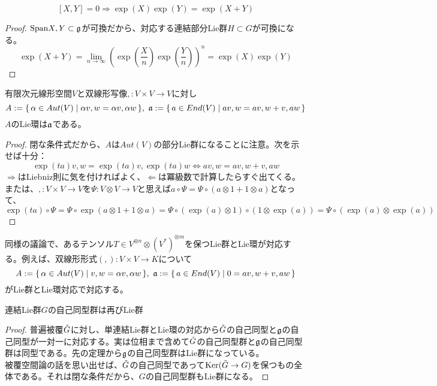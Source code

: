 \begin{thm}
    \[[X,Y]=0\Rightarrow \exp(X)\exp(Y)=\exp(X+Y)\]
\end{thm}
\begin{proof}
    $\spn{X,Y}\subset\g$が可換だから、対応する連結部分Lie群$H\subset G$が可換になる。
    \[\exp(X+Y)=\lim_{n\to\infty}\left(\exp\left(\frac{X}{n}\right)\exp\left(\frac{Y}{n}\right)\right)^n=\exp(X)\exp(Y)\]
\end{proof}
\begin{thm}
    有限次元線形空間$V$と双線形写像${,}:V\times V\to V$に対し
    \[A:=\set{\alpha\in Aut(V)}{\alpha{v,w}={\alpha v,\alpha w}},\ \a:=\set{a\in End(V)}{a{v,w}={av,w}+{v,aw}}\]
    $A$のLie環は$\a$である。
\end{thm}
\begin{proof}
    閉な条件式だから、$A$は$Aut(V)$の部分Lie群になることに注意。次を示せば十分：
    \[\exp(ta){v,w}={\exp(ta)v,\exp(ta)w}\iff a{v,w}={av,w}+{v,aw}\]
    $\Rightarrow$はLiebniz則に気を付ければよく、$\Leftarrow$は冪級数で計算したらすぐ出てくる。\\
    または、${,}:V\times V\to V$を$\Psi:V\otimes V\to V$と思えば$a\circ\Psi=\Psi\circ(a\otimes1+1\otimes a)$となって、
    \[\exp(ta)\circ\Psi=\Psi\circ\exp(a\otimes1+1\otimes a)=\Psi\circ(\exp(a)\otimes1)\circ(1\otimes\exp(a))=\Psi\circ(\exp(a)\otimes\exp(a))\]
\end{proof}
同様の議論で、あるテンソル$T\in V^{\otimes n}\otimes (V^*)^{\otimes m}$を保つLie群とLie環が対応する。例えば、双線形形式$(,):V\times V\to K$について
\[A:=\set{\alpha\in Aut(V)}{{v,w}={\alpha v,\alpha w}},\ \a:=\set{a\in End(V)}{0={av,w}+{v,aw}}\]
がLie群とLie環対応で対応する。
\begin{cor}
    連結Lie群$G$の自己同型群は再びLie群
\end{cor}
\begin{proof}
    普遍被覆$\Tilde{G}$に対し、単連結Lie群とLie環の対応から$\Tilde{G}$の自己同型と$\g$の自己同型が一対一に対応する。実は位相まで含めて$\Tilde{G}$の自己同型群\footnotemark と$\g$の自己同型群は同型である。先の定理から$\g$の自己同型群はLie群になっている。\\
    被覆空間論の話を思い出せば、$\Tilde{G}$の自己同型であって$\ker(\Tilde{G}\to G)$を保つもの全体である。それは閉な条件だから、$G$の自己同型群もLie群になる。
\end{proof}


